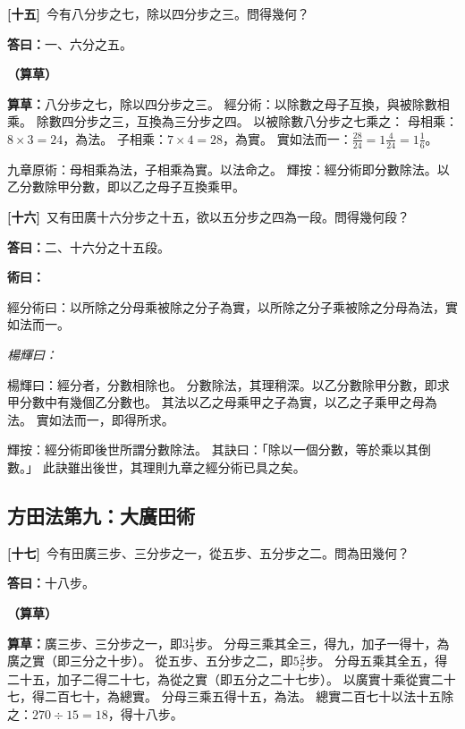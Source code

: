 \documentclass[11pt,a4paper]{article}
\newenvironment{method}{%
  \par\noindent\textcolor{methodcolor}{\textbf{術曰：}}%
  \ignorespaces
}{\par\vspace{0.5em}}
\newenvironment{caocao}{%
  \par\noindent\textcolor{caocaocolor}{\small\textbf{（算草）}}%
  \ignorespaces
}{\par\vspace{0.5em}}
\newenvironment{yanghuicomment}{%
  \par\noindent\textcolor{commentarycolor}{\small\textit{楊輝曰：}}%
  \ignorespaces
}{\par\vspace{0.5em}}
\newcommand{\problemnum}[1]{\textbf{[\ignorespaces#1\unskip]}}
\begin{document}
\noindent\problemnum{十五}\,
今有八分步之七，除以四分步之三。問得幾何？

\noindent\textcolor{answercolor}{\textbf{答曰：}}一、六分之五。

\begin{caocao}
\textbf{算草：}八分步之七，除以四分步之三。
經分術：以除數之母子互換，與被除數相乘。
除數四分步之三，互換為三分步之四。
以被除數八分步之七乘之：
母相乘：$8 \times 3 = 24$，為法。
子相乘：$7 \times 4 = 28$，為實。
實如法而一：$\frac{28}{24} = 1\frac{4}{24} = 1\frac{1}{6}$。

九章原術：母相乘為法，子相乘為實。以法命之。
輝按：經分術即分數除法。以乙分數除甲分數，即以乙之母子互換乘甲。
\end{caocao}

\noindent\problemnum{十六}\,
又有田廣十六分步之十五，欲以五分步之四為一段。問得幾何段？

\noindent\textcolor{answercolor}{\textbf{答曰：}}二、十六分之十五段。

\begin{method}
經分術曰：以所除之分母乘被除之分子為實，以所除之分子乘被除之分母為法，實如法而一。
\end{method}

\begin{yanghuicomment}
楊輝曰：經分者，分數相除也。
分數除法，其理稍深。以乙分數除甲分數，即求甲分數中有幾個乙分數也。
其法以乙之母乘甲之子為實，以乙之子乘甲之母為法。
實如法而一，即得所求。

輝按：經分術即後世所謂分數除法。
其訣曰：「除以一個分數，等於乘以其倒數。」
此訣雖出後世，其理則九章之經分術已具之矣。
\end{yanghuicomment}

\subsection{方田法第九：大廣田術}

\noindent\problemnum{十七}\,
今有田廣三步、三分步之一，從五步、五分步之二。問為田幾何？

\noindent\textcolor{answercolor}{\textbf{答曰：}}十八步。

\begin{caocao}
\textbf{算草：}廣三步、三分步之一，即$3\frac{1}{3}$步。
分母三乘其全三，得九，加子一得十，為廣之實（即三分之十步）。
從五步、五分步之二，即$5\frac{2}{5}$步。
分母五乘其全五，得二十五，加子二得二十七，為從之實（即五分之二十七步）。
以廣實十乘從實二十七，得二百七十，為總實。
分母三乘五得十五，為法。
總實二百七十以法十五除之：$270 \div 15 = 18$，得十八步。
\end{caocao}
\end{document}
